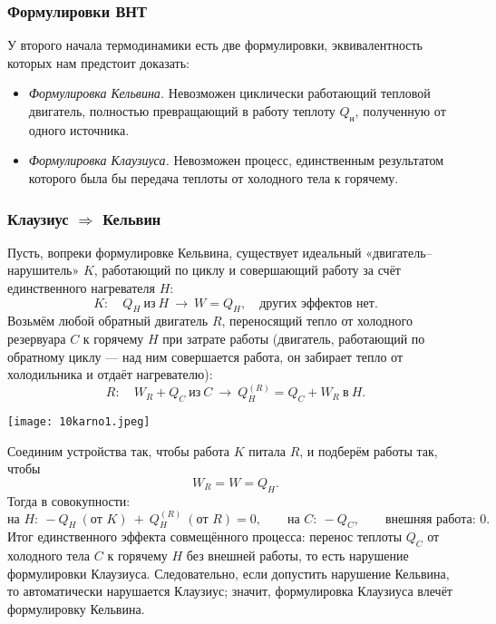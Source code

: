 \documentclass[12pt, a4paper]{article}%
\begin{document}
\subsubsection*{Формулировки ВНТ}

У второго начала термодинамики есть две формулировки, эквивалентность которых нам предстоит доказать:

\begin{itemize}
  \item \textit{Формулировка Кельвина.} Невозможен циклически работающий тепловой двигатель, полностью превращающий в работу теплоту $Q_{\text{н}}$, полученную от одного источника.
  \item \textit{Формулировка Клаузиуса.} Невозможен процесс, единственным результатом которого была бы передача теплоты от холодного тела к горячему.
\end{itemize}



\subsubsection*{Клаузиус $\Rightarrow$ Кельвин}

Пусть, вопреки формулировке Кельвина, существует идеальный «двигатель–нарушитель» $K$, работающий по циклу и совершающий работу за счёт единственного нагревателя $H$:
\[
K:\quad Q_H\ \text{из}\ H \ \longrightarrow\ W=Q_H,\quad \text{других эффектов нет.}
\]
Возьмём любой обратный двигатель $R$, переносящий тепло от холодного резервуара $C$ к горячему $H$ при затрате работы (двигатель, работающий по обратному циклу --- над ним совершается работа, он забирает тепло от холодильника и отдаёт нагревателю):
\[
R:\quad W_R +Q_C\ \text{из}\ C \ \longrightarrow\ Q_H^{(R)}=Q_C+W_R\ \text{в}\ H.
\]

\begin{center}
\texttt{[image: 10karno1.jpeg]}
\label{fig:mpr}
\end{center}

Соединим устройства так, чтобы работа $K$ питала $R$, и подберём работы так, чтобы
\[
W_R=W=Q_H.
\]
Тогда в совокупности:
\[
\text{на } H:\ -Q_H\ (\text{от }K)\ +\ Q_H^{(R)}\ (\text{от }R)=0,\qquad
\text{на } C:\ -Q_C,\qquad \text{внешняя работа: }0.
\]
Итог единственного эффекта совмещённого процесса: перенос теплоты $Q_C$ от холодного тела $C$ к горячему $H$ без внешней работы, то есть нарушение формулировки Клаузиуса. Следовательно, если допустить нарушение Кельвина, то автоматически нарушается Клаузиус; значит, формулировка Клаузиуса влечёт формулировку Кельвина.
\end{document}
